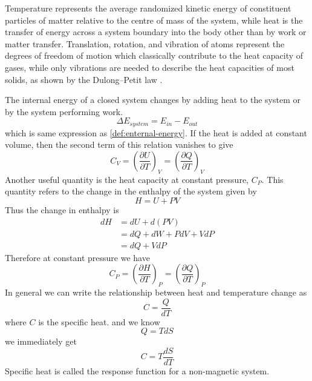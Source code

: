 	Temperature represents the average randomized kinetic energy of constituent particles of matter relative to the centre of mass of the system, while heat is the transfer of energy across a system boundary into the body other than by work or matter transfer. Translation, rotation, and vibration of atoms represent the degrees of freedom of motion which classically contribute to the heat capacity of gases, while only vibrations are needed to describe the heat capacities of most solids, as shown by the Dulong–Petit law \cite{Kittel2004}.
	
	
	The internal energy of a closed system changes by adding heat to the system or by the system performing work.
	\begin{equation}
		\Delta E_{system} = E_{in} - E_{out}
	\end{equation}
	which is same expression as \ref{def:enternal-energy}. If the heat is added at constant volume, then the second term of this relation vanishes to give
	\begin{equation}
		C_V = \left(\frac{\partial U}{\partial T}\right)_V = \left(\frac{\partial Q}{\partial T}\right)_V
	\end{equation}
	Another useful quantity is the heat capacity at constant pressure, $C_P$. This quantity refers to the change in the enthalpy of the system given by
	\begin{equation}
		H = U + PV
	\end{equation}
	Thus the change in enthalpy is 
	\begin{align}
		dH 
		&= dU + d(PV) \nonumber \\
		&= dQ + dW + PdV + VdP \nonumber \\
		&= dQ  + VdP
	\end{align}
	Therefore at constant pressure we have
	\begin{equation}
		C_P = \left(\frac{\partial H}{\partial T}\right)_P = \left(\frac{\partial Q}{\partial T}\right)_P
	\end{equation}
	In general we can write the relationship between heat and temperature change as
	\begin{equation}
		C = \frac{Q}{dT}
	\end{equation}
	 where $C$ is the specific heat.
	and we know
	\begin{equation}
		Q = T dS
	\end{equation}
	we immediately get
	\begin{equation}
		C = T \frac{dS}{dT}
		\label{def:specific-heat-thermodynamics}
	\end{equation}
	Specific heat is called the response function for a non-magnetic system.
		
